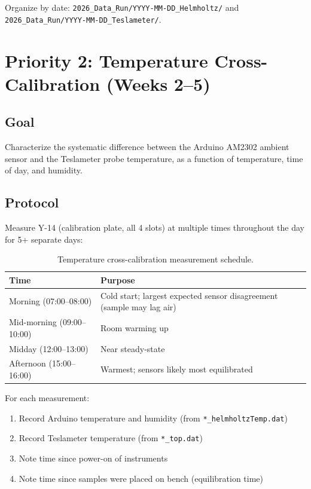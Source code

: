 \documentclass[11pt,letterpaper]{article}
\begin{document}
Organize by date: \texttt{2026\_Data\_Run/YYYY-MM-DD\_Helmholtz/} and
\texttt{2026\_Data\_Run/YYYY-MM-DD\_Teslameter/}.


\section{Priority 2: Temperature Cross-Calibration (Weeks 2--5)}
\label{sec:p2}

\subsection{Goal}

Characterize the systematic difference between the Arduino AM2302 ambient sensor
and the Teslameter probe temperature, as a function of temperature, time of day,
and humidity.

\subsection{Protocol}

Measure Y-14 (calibration plate, all 4 slots) at multiple times throughout the
day for 5+ separate days:

\begin{table}[htbp]
\centering
\caption{Temperature cross-calibration measurement schedule.}
\label{tab:p2-schedule}
\begin{tabular}{@{}lp{9cm}@{}}
\toprule
Time & Purpose \\
\midrule
Morning (07:00--08:00)     & Cold start; largest expected sensor disagreement (sample may lag air) \\
Mid-morning (09:00--10:00) & Room warming up \\
Midday (12:00--13:00)      & Near steady-state \\
Afternoon (15:00--16:00)   & Warmest; sensors likely most equilibrated \\
\bottomrule
\end{tabular}
\end{table}

For each measurement:
\begin{enumerate}[nosep]
  \item Record Arduino temperature and humidity (from \texttt{*\_helmholtzTemp.dat})
  \item Record Teslameter temperature (from \texttt{*\_top.dat})
  \item Note time since power-on of instruments
  \item Note time since samples were placed on bench (equilibration time)
\end{enumerate}
\end{document}
